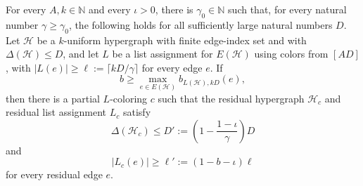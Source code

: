 \begin{lemma}
For every $A,k\in\mathbb N$ and every $\iota>0$, there is
$\gamma_0\in\mathbb N$ such that, for every natural number
$\gamma\ge\gamma_0$, the following holds for all sufficiently large natural
numbers $D$.  Let $\mathcal H$ be a $k$-uniform hypergraph with
finite edge-index set and with $\Delta(\mathcal H)\le D$, and let $L$ be a
list assignment for $E(\mathcal H)$ using colors from $[AD]$, with
$|L(e)|\ge \ell:=\lceil kD/\gamma\rceil$ for every edge $e$.  If
\[
b\ge \max_{e\in E(\mathcal H)} b_{L(\mathcal H),kD}(e),
\]
then there is a partial $L$-coloring $c$ such that the residual hypergraph
$\mathcal H_c$ and residual list assignment $L_c$ satisfy
\[
\Delta(\mathcal H_c)\le D':=\left(1-\frac{1-\iota}{\gamma}\right)D
\]
and
\[
|L_c(e)|\ge \ell':=(1-b-\iota)\ell
\]
for every residual edge $e$.
\end{lemma}
